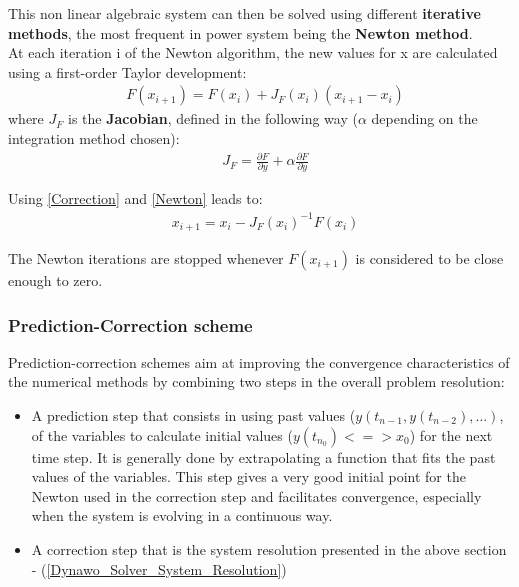 \documentclass[a4paper, 12pt]{report}
\begin{document}
This non linear algebraic system can then be solved using different \textbf{iterative methods}, the most frequent in power system being the \textbf{Newton method}. \\

At each iteration i of the Newton algorithm, the new values for x are calculated using a first-order Taylor development:
\begin{equation}
\begin{aligned}
& F(x_{i+1}) = F(x_i) + J_F(x_i)(x_{i+1} - x_i)
\end{aligned}
\label{Newton}
\end{equation}
where $J_F$ is the \textbf{Jacobian}, defined in the following way ($\alpha$ depending on the integration method chosen):
\begin{equation}
\begin{aligned}
& J_F = \frac{\partial F}{\partial y} + \alpha \frac{\partial F}{\partial \dot{y}}
\end{aligned}
\end{equation}

Using \eqref{Correction} and \eqref{Newton} leads to:
\begin{equation}
\begin{aligned}
& x_{i+1} = x_i - J_F(x_i)^{-1} F(x_i)
\end{aligned}
\label{Linear}
\end{equation}

The Newton iterations are stopped whenever $F(x_{i+1})$ is considered to be close enough to zero.

\subsubsection{Prediction-Correction scheme}

Prediction-correction schemes aim at improving the convergence characteristics of the numerical methods by combining two steps in the overall problem resolution:
\begin{itemize}
\item A prediction step that consists in using past values ($y(t_{n-1}, y(t_{n-2}), ...)$,  of the variables to calculate initial values ($y(t_{n_0}) <=> x_0$) for the next time step. It is generally done by extrapolating a function that fits the past values of the variables. This step gives a very good initial point for the Newton used in the correction step and facilitates convergence, especially when the system is evolving in a continuous way.
\item A correction step that is the system resolution presented in the above section - (\ref{Dynawo_Solver_System_Resolution})
\end{itemize}
\end{document}
